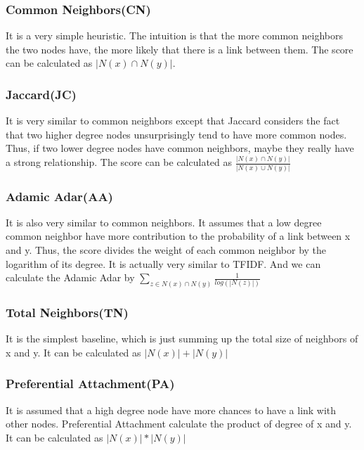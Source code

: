 \documentclass[12pt]{article}
\begin{document}
\subsubsection{Common Neighbors(CN)}
It is a very simple heuristic. The intuition is that the more common neighbors the two nodes have, the more likely that there is a link between them. The score can be calculated as $|N(x) \cap N(y)|$.
\subsubsection{Jaccard(JC)}
It is very similar to common neighbors except that Jaccard considers the fact that two higher degree nodes unsurprisingly tend to have more common nodes. Thus, if two lower degree nodes have common neighbors, maybe they really have a strong relationship. The score can be calculated as $\frac{|N(x) \cap N(y)|}{|N(x) \cup N(y)|}$
\subsubsection{Adamic Adar(AA)}
It is also very similar to common neighbors. It assumes that a low degree common neighbor have more contribution to the probability of a link between x and y. Thus, the score divides the weight of each common neighbor by the logarithm of its degree. It is actually very similar to TFIDF. And we can calculate the Adamic Adar by $\sum_{z \in N(x) \cap N(y)}{\frac{1}{log(|N(z)|)}}$
\subsubsection{Total Neighbors(TN)}
It is the simplest baseline, which is just summing up the total size of neighbors of x and y. It can be calculated as $|N(x)| + |N(y)|$
\subsubsection{Preferential Attachment(PA)}
It is assumed that a high degree node have more chances to have a link with other nodes. Preferential Attachment calculate the product of degree of x and y. It can be calculated as $|N(x)| * |N(y)|$
\end{document}
